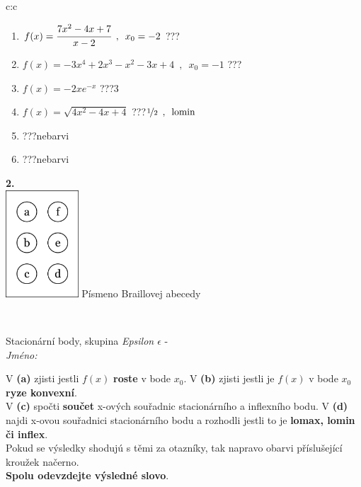 \documentclass[10pt]{report}
\begin{document}
\begin{tabular}{c:c}
\begin{minipage}[c][104.5mm][t]{0.5\linewidth}
\begin{center}
\begin{minipage}{0.79\linewidth}
\begin{center}
\begin{varwidth}{\linewidth}
\begin{enumerate}
\item $f(x)=\cfrac{7x^2-4x+7}{x-2}\enspace , \enspace x_0=-2$\quad \dotfill\; ???\;\dotfill \quad {}
\item $f(x)=-3x^4+2x^3-x^2-3x+4\enspace , \enspace x_0=-1$\quad \dotfill\; ???\;\dotfill \quad {}
\item $f(x)=-2xe^{-x}$\quad \dotfill\; ???\;\dotfill \quad $3$
\item $f(x)=\sqrt{4x^2-4x+4}$\quad \dotfill\; ???\;\dotfill \quad $\nicefrac{1}{2}\enspace , \enspace \mathrm{lomin}$
\item \quad \dotfill\; ???\;\dotfill \quad nebarvi
\item \quad \dotfill\; ???\;\dotfill \quad nebarvi
\end{enumerate}
\end{varwidth}
\end{center}
\end{minipage}
\begin{minipage}{0.20\linewidth}
\begin{center}
{\Huge\bfseries 2.} \\[2mm]
\includegraphics[height=40mm]{../images/braille.png}
{\small Písmeno Braillovej abecedy}
\end{center}
\end{minipage}
\end{center}
\end{minipage}
\\ \hdashline
\begin{minipage}[c][104.5mm][t]{0.5\linewidth}
\begin{center}
\vspace{7mm}
{\huge Stacionární body, skupina \textit{Epsilon $\epsilon$} -}\\[5mm]
\textit{Jméno:}\phantom{xxxxxxxxxxxxxxxxxxxxxxxxxxxxxxxxxxxxxxxxxxxxxxxxxxxxxxxxxxxxxxxxx}\\[5mm]
\begin{minipage}{0.95\linewidth}
\begin{center}
{\small V \textbf{(a)} zjisti jestli $f(x)$ \textbf{roste} v bode $x_0$. V \textbf{(b)} zjisti jestli je $f(x)$ v bode $x_0$ \textbf{ryze konvexní}.\\V \textbf{(c)} spočti \textbf{součet} x-ových souřadnic stacionárního a inflexního bodu. V \textbf{(d)} najdi x-ovou souřadnici stacionárního bodu a rozhodli jestli to je \textbf{lomax, lomin či inflex}.\\Pokud se výsledky shodujú s těmi za otazníky, tak napravo obarvi příslušející kroužek načerno.\\\textbf{Spolu odevzdejte výsledné slovo}}.

\end{center}
\end{minipage}
\end{center}
\end{minipage}
\end{tabular}
\end{document}
